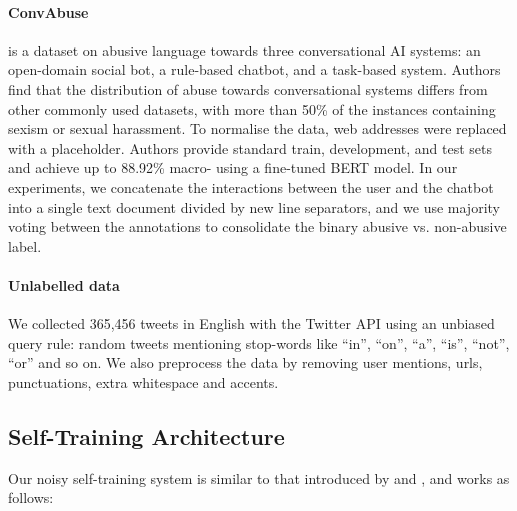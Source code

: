 \documentclass[11pt,a4paper]{article}
\begin{document}
\paragraph{ConvAbuse} \citep{convabusedataset} is a dataset on abusive language towards three conversational AI systems: an open-domain social bot, a rule-based chatbot, and a task-based system. Authors find that the distribution of abuse towards conversational systems differs from other commonly used datasets, with more than 50\% of the instances containing sexism or sexual harassment. To normalise the data, web addresses were replaced with a placeholder. Authors provide standard train, development, and test sets and achieve up to 88.92\% macro- using a fine-tuned BERT model. In our experiments, we concatenate the interactions between the user and the chatbot into a single text document divided by new line separators, and we use majority voting between the annotations to consolidate the binary abusive vs. non-abusive label.

\paragraph{Unlabelled data} We collected 365,456 tweets in English with the Twitter API using an unbiased query rule: random tweets mentioning stop-words like ``in'', ``on'', ``a'', ``is'', ``not'', ``or'' and so on. We also preprocess the data by removing user mentions, urls, punctuations, extra whitespace and accents.

\subsection{Self-Training Architecture} \label{sec:system-description}
Our noisy self-training system is similar to that introduced by \citet{noisystudent} and \citet{xie2020unsupervised}, and works as follows:
\end{document}
